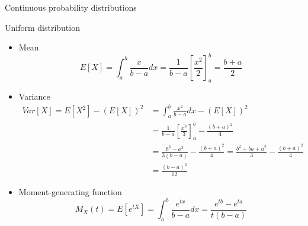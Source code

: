 \documentclass[8pt]{beamer}
\renewcommand{\emph}[1]{\textcolor{myorange}{#1}}
\begin{document}
\begin{frame}{Continuous probability distributions}
    \begin{block}{\alert{Uniform} distribution}

        \begin{itemize}
            \item \emph{Mean}
                \[
                    E[X] = \int_a^b \frac{x}{b-a} dx = \frac{1}{b-a} \left[ \frac{x^2}{2} \right]_a^b = \frac{b+a}{2}
                \]
            \item \emph{Variance}
         \begin{align*}
             \displaystyle
             Var[X] = E[X^2] - \left( E[X] \right)^2 &= \int_a^b \frac{x^2}{b-a} dx - \left( E[X] \right)^2  \\
                                                     &= \frac{1}{b-a} \left[ \frac{x^3}{3} \right]_a^b -  \frac{(b+a)^2}{4} \\
                                                     &= \frac{b^3 - a^3}{3(b-a)} - \frac{(b+a)^2}{4} = \frac{b^2 + ba + a^2}{3} - \frac{(b+a)^2}{4}\\
                                                     &= \frac{(b-a)^2}{12}
        \end{align*}
    \item \emph{Moment-generating function}
\[
    M_X (t) = E \left[e^{tX} \right] = \int_a^b \frac{e^{tx}}{b-a} dx = \frac{e^{tb} - e^{ta}}{t(b-a)}
\]

        \end{itemize}
    \end{block}
\end{frame}
\end{document}
